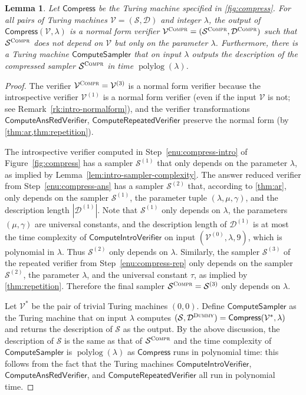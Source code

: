 \documentclass[11pt]{article}
\newtheorem{lemma}[theorem]{Lemma}
\theoremstyle{definition}
\DeclareMathOperator{\polylog}{polylog}
\newcommand{\sampler}{\mathcal{S}}
\newcommand{\decider}{\mathcal{D}}
\newcommand{\verifier}{\mathcal{V}}
\newcommand{\gamestyle}[1]{\ensuremath{\textsc{#1}}\xspace}
\newcommand{\compr}{\textsc{Compr}}
\newcommand{\tmstyle}[1]{\ensuremath{\mathsf{#1}}}
\newcommand{\Compress}{\tmstyle{Compress}}
\newcommand{\ComputeSampler}{\tmstyle{ComputeSampler}}
\newcommand{\ComputeIntroVerifier}{\tmstyle{ComputeIntroVerifier}}
\newcommand{\ComputeAnsVerifier}{\tmstyle{ComputeAnsRedVerifier}}
\newcommand{\ComputeParrepVerifier}{\tmstyle{ComputeRepeatedVerifier}}
\begin{document}
\begin{lemma}
  \label{lem:compress-independent-samplers}
  Let $\Compress$ be the Turing machine specified in \cref{fig:compress}.
  For all pairs of Turing machines $\verifier = (\sampler,\decider)$ and integer $\lambda$, the output of
  $\Compress(\verifier, \lambda)$ is a normal form verifier $\verifier^\compr =
  (\sampler^\compr, \decider^\compr)$ such that $\sampler^\compr$ does not
  depend on $\verifier$ but only on the parameter $\lambda$.
  Furthermore, there is a Turing machine $\ComputeSampler$ that on input
  $\lambda$ outputs the description of the compressed sampler $\sampler^\compr$
  in time $\polylog(\lambda)$.
\end{lemma}

\begin{proof}
  The verifier $\verifier^\compr = \verifier^{(3)}$ is a normal form verifier
  because the introspective verifier $\verifier^{(1)}$ is a normal form verifier (even if
  the input $\verifier$ is not; see Remark~\ref{rk:intro-normalform}), and 
  the verifier transformations $\ComputeAnsVerifier$, $\ComputeParrepVerifier$ preserve 
  the normal form (by \cref{thm:ar,thm:repetition}).  


  The introspective verifier computed in Step~\ref{enu:compress-intro} of
  Figure~\ref{fig:compress} has a sampler $\sampler^{(1)}$ that only depends on
  the parameter $\lambda$, as implied by
  Lemma~\ref{lem:intro-sampler-complexity}.
  The answer reduced verifier from Step~\ref{enu:compress-ans} has a sampler $\sampler^{(2)}$ 
  that, according to \cref{thm:ar}, only depends on the sampler $\sampler^{(1)}$, the parameter tuple $(\lambda,\mu,\gamma)$, 
  and the description length $|\decider^{(1)}|$. Note that $\sampler^{(1)}$ only depends on $\lambda$, the parameters $(\mu,\gamma)$ are universal constants, and the description length
  of $\decider^{(1)}$ is at most the time complexity of $\ComputeIntroVerifier$ on input $(\verifier^{(0)}, \lambda,9)$, which is polynomial in $\lambda$. Thus $\sampler^{(2)}$ only depends on $\lambda$. Similarly, the sampler $\sampler^{(3)}$ of the repeated verifier from Step~\ref{enu:compress-rep} only depends on the sampler $\sampler^{(2)}$, the parameter $\lambda$, and the universal constant $\tau$, as implied by \cref{thm:repetition}. Therefore the final sampler $\sampler^\compr = \sampler^{(3)}$ only depends on $\lambda$.
  
  


  Let $\verifier^*$ be the pair of trivial Turing machines $(0,0)$. Define $\ComputeSampler$ as the Turing machine that on input $\lambda$
  computes $(\sampler, \decider^{\gamestyle{Dummy}}) =
  \Compress(\verifier^*, \lambda)$ and returns the description of $\sampler$ as
  the output. By the above discussion, the description of $\sampler$ is the same
  as that of $\sampler^\compr$ and the time complexity of $\ComputeSampler$ is 
  $\polylog(\lambda)$ as $\Compress$ runs in polynomial time: this follows from
  the fact that the Turing machines $\ComputeIntroVerifier$,
  $\ComputeAnsVerifier$, and $\ComputeParrepVerifier$ all run in polynomial time.
\end{proof}
\end{document}
